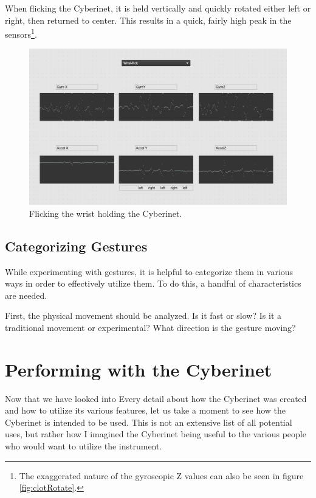 When flicking the Cyberinet, it is held vertically and quickly rotated either left or right, then returned to center. This results in a quick, fairly high peak in the sensors\footnote{The exaggerated nature of the gyroscopic Z values can also be seen in figure \ref{fig:clotRotate}.}.

\begin{figure}
    \centering
    \includegraphics[scale=0.2]{diagrams/gestureData/wristFlick.png}
    \caption{Flicking the wrist holding the Cyberinet.}
    \label{fig:cflick}
\end{figure}


\section{Categorizing Gestures}
While experimenting with gestures, it is helpful to categorize them in various ways in order to effectively utilize them. To do this, a handful of characteristics are needed.

First, the physical movement should be analyzed. Is it fast or slow? Is it a traditional movement or experimental? What direction is the gesture moving?


\chapter{Performing with the Cyberinet}
Now that we have looked into Every detail about how the Cyberinet was created and how to utilize its various features, let us take a moment to see how the Cyberinet is intended to be used. This is not an extensive list of all potential uses, but rather how I imagined the Cyberinet being useful to the various people who would want to utilize the instrument.


